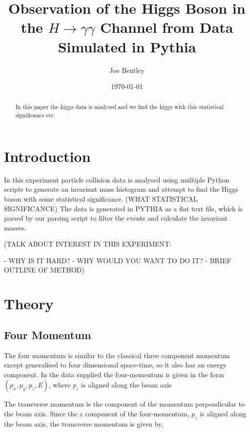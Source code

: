 \documentclass[11pt]{amsart}
\title{Observation of the Higgs Boson in the $H \to \gamma\gamma$ Channel from Data Simulated in Pythia}
\author{Joe Bentley}
\date{\today}
\begin{document}
\begin{abstract}
  In this paper the higgs data is analysed and we find the higgs with this statistical significance etc.
\end{abstract}

\maketitle

\newpage

\pagestyle{fancyplain}


\begin{multicols}{2}

\section{Introduction}

In this experiment particle collision data is analysed using multiple Python scripts to generate an invariant mass histogram and attempt to find the Higgs boson with some statistical significance. (WHAT STATISTICAL SIGNIFICANCE) The data is generated in PYTHIA as a flat text file, which is parsed by our parsing script to filter the events and calculate the invariant masses.

(TALK ABOUT INTEREST IN THIS EXPERIMENT:

- WHY IS IT HARD?
- WHY WOULD YOU WANT TO DO IT?
- BRIEF OUTLINE OF METHOD)

\section{Theory}

\subsection{Four Momentum}
\label{sec:fourmomentum}

The four momentum is similar to the classical three component momentum except generalised to four dimensional space-time, so it also has an energy component. \cite{kinematics} In the data supplied the four-momentum is given in the form $(p_x, p_y, p_z, E)$, where $p_z$ is aligned along the beam axis

The transverse momentum is the component of the momentum perpendicular to the beam axis. Since the $z$ component of the four-momentum, $p_z$ is aligned along the beam axis, the transverse momentum is given by,


\end{multicols}
\end{document}
